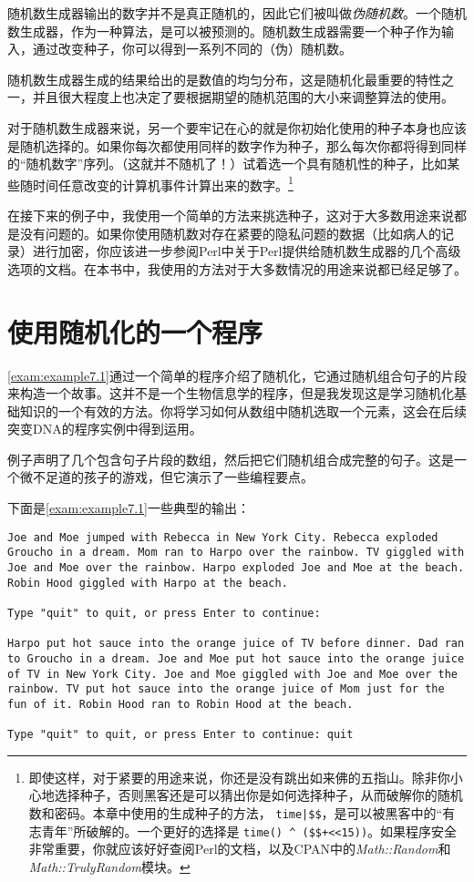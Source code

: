 随机数生成器输出的数字并不是真正随机的，因此它们被叫做\textit{伪随机数}。一个随机数生成器，作为一种算法，是可以被预测的。随机数生成器需要一个种子作为输入，通过改变种子，你可以得到一系列不同的（伪）随机数。

随机数生成器生成的结果给出的是数值的均匀分布，这是随机化最重要的特性之一，并且很大程度上也决定了要根据期望的随机范围的大小来调整算法的使用。

对于随机数生成器来说，另一个要牢记在心的就是你初始化使用的种子本身也应该是随机选择的。如果你每次都使用同样的数字作为种子，那么每次你都将得到同样的“随机数字”序列。（这就并不随机了！）试着选一个具有随机性的种子，比如某些随时间任意改变的计算机事件计算出来的数字。\footnote{即使这样，对于紧要的用途来说，你还是没有跳出如来佛的五指山。除非你小心地选择种子，否则黑客还是可以猜出你是如何选择种子，从而破解你的随机数和密码。本章中使用的生成种子的方法， \verb=time|$$=，是可以被黑客中的“有志青年”所破解的。一个更好的选择是 \verb=time() ^ ($$+<<15))=。如果程序安全非常重要，你就应该好好查阅Perl的文档，以及CPAN中的\textit{Math::Random}和\textit{Math::TrulyRandom}模块。}

在接下来的例子中，我使用一个简单的方法来挑选种子，这对于大多数用途来说都是没有问题的。如果你使用随机数对存在紧要的隐私问题的数据（比如病人的记录）进行加密，你应该进一步参阅Perl中关于Perl提供给随机数生成器的几个高级选项的文档。在本书中，我使用的方法对于大多数情况的用途来说都已经足够了。

\section{使用随机化的一个程序}
\autoref{exam:example7.1}通过一个简单的程序介绍了随机化，它通过随机组合句子的片段来构造一个故事。这并不是一个生物信息学的程序，但是我发现这是学习随机化基础知识的一个有效的方法。你将学习如何从数组中随机选取一个元素，这会在后续突变DNA的程序实例中得到运用。

例子声明了几个包含句子片段的数组，然后把它们随机组合成完整的句子。这是一个微不足道的孩子的游戏，但它演示了一些编程要点。



下面是\autoref{exam:example7.1}一些典型的输出：

\begin{lstlisting}[breaklines=true]
Joe and Moe jumped with Rebecca in New York City. Rebecca exploded Groucho in a dream. Mom ran to Harpo over the rainbow. TV giggled with Joe and Moe over the rainbow. Harpo exploded Joe and Moe at the beach. Robin Hood giggled with Harpo at the beach. 

Type "quit" to quit, or press Enter to continue: 

Harpo put hot sauce into the orange juice of TV before dinner. Dad ran to Groucho in a dream. Joe and Moe put hot sauce into the orange juice of TV in New York City. Joe and Moe giggled with Joe and Moe over the rainbow. TV put hot sauce into the orange juice of Mom just for the fun of it. Robin Hood ran to Robin Hood at the beach. 

Type "quit" to quit, or press Enter to continue: quit
\end{lstlisting}

